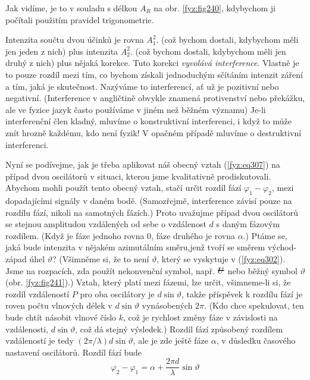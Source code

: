 {    Jak vidíme, je to v souladu s délkou \(A_R\) na obr. \ref{fyz:fig240}, kdybychom ji počítali 
    použitím pravidel trigonometrie. 
    
    Intenzita součtu dvou účinků je rovna \(A_1^2\). (což bychom dostali, kdybychom měli jen jeden 
    z nich) plus intenzita \(A_2^2\). (což bychom dostali, kdybychom měli jen druhý z nich) plus 
    nějaká korekce. Tuto korekci \emph{vyvolává interference}. Vlastně je to pouze rozdíl mezi tím, 
    co bychom získali jednoduchým sčítáním intenzit záření a tím, jaká je skutečnost. Nazýváme to 
    interferencí, ať už je pozitivní nebo negativní. (Interference v angličtině obvykle znamená 
    protivenství nebo překážku, ale ve fyzice jazyk často používáme v jiném než běžném významu) 
    Je-li interferenční člen kladný, mluvíme o konstruktivní interferenci, i když to může znít 
    hrozně každému, kdo není fyzik! V opačném případě mluvíme o destruktivní interferenci. 
    
    Nyní se podívejme, jak je třeba aplikovat náš obecný vztah (\ref{fyz:eq307}) na případ dvou 
    oscilátorů v situaci, kterou jsme kvalitativně prodiskutovali. Abychom mohli použít tento 
    obecný vztah, stačí určit rozdíl fází \(\varphi_1-\varphi_2\), mezi dopadajícími signály v 
    daném bodě. (Samozřejmě, interference závisí pouze na rozdílu fází, nikoli na samotných 
    fázích.) Proto uvažujme případ dvou oscilátorů se stejnou amplitudou vzdálených od sebe o 
    vzdálenost \(d\) s daným fázovým rozdílem. (Když je fáze jednoho rovna \(0\), fáze druhého je 
    rovna \(\alpha\).) Ptáme se, jaká bude intenzita v nějakém azimutálním směru,jenž tvoří se 
    směrem východ-západ úhel \(\vartheta\)? (Všimněme si, že to není \(\vartheta\), který se 
    vyskytuje v (\ref{fyz:eq302}). Jsme na rozpacích, zda použít nekonvenční symbol, např. 
    \(\hcancel{U}\) nebo běžný symbol \(\vartheta\) (obr. \ref{fyz:fig241}).) Vztah, který platí 
    mezi fázemi, lze určit, všimneme-li si, že rozdíl vzdáleností \(P\) pro oba oscilátory je 
    \(d\sin\vartheta\), takže příspěvek k rozdílu fází je roven počtu vlnových délek v 
    \(d\sin\vartheta\) vynásobených \(2\pi\). (Kdo chce spekulovat, ten bude chtít násobit vlnové 
    číslo \(k\), což je rychlost změny fáze v závislosti na vzdálenosti, \(d\sin\vartheta\), což dá 
    stejný výsledek.) Rozdíl fází způsobený rozdílem vzdáleností je tedy 
    \((2\pi/\lambda)d\sin\vartheta\), ale je zde ještě fáze \(\alpha\), v důsledku časového 
    nastavení oscilátorů. Rozdíl fází bude
    \begin{equation}\label{fyz:eq315}
      \varphi_2-\varphi_1 = \alpha  + \frac{2\pi d}{\lambda}\sin\vartheta
    \end{equation}
    
}
